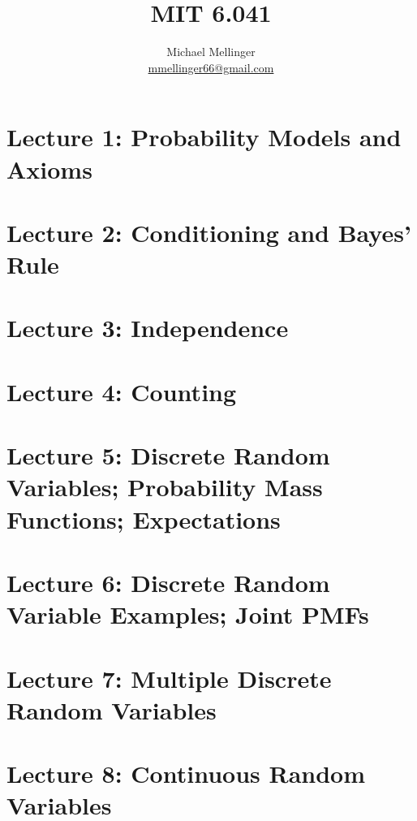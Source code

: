 \documentclass{article}
\title{MIT 6.041}
\author{Michael Mellinger \\ \href{mailto:mmellinger66@gmail.com}{mmellinger66@gmail.com} }
\begin{document}
\maketitle
\tableofcontents
\clearpage

\section{Lecture 1: Probability Models and Axioms}



\section{Lecture 2: Conditioning and Bayes' Rule}



\section{Lecture 3: Independence}



\section{Lecture 4: Counting}



\section{Lecture 5: Discrete Random Variables; Probability Mass Functions; Expectations}



\section{Lecture 6: Discrete Random Variable Examples; Joint PMFs}



\section{Lecture 7: Multiple Discrete Random Variables}



\section{Lecture 8: Continuous Random Variables}
\end{document}
